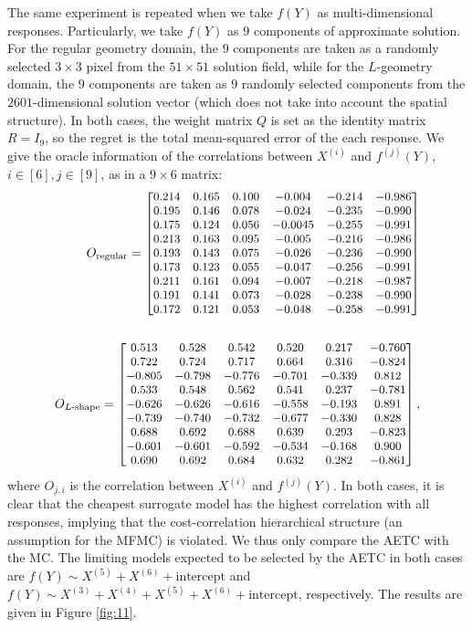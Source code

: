 \documentclass[a4paper,11pt]{article}
\numberwithin{equation}{section}
\theoremstyle{plain}
\theoremstyle{definition}
\begin{document}
The same experiment is repeated when we take $f(Y)$ as multi-dimensional responses. 
Particularly, we take $f(Y)$ as $9$ components of approximate solution.  
For the regular geometry domain, the $9$ components are taken as a randomly selected $3\times 3$ pixel from the $51\times 51$ solution field, while for the $L$-geometry domain, the $9$ components are taken as $9$ randomly selected components from the $2601$-dimensional solution vector (which does not take into account the spatial structure). 
In both cases, the weight matrix $Q$ is set as the identity matrix $R = I_9$, so the regret is the total mean-squared error of the each response. 
We give the oracle information of the correlations between $X^{(i)}$ and $f^{(j)}(Y)$, $i\in [6], j\in [9]$, as in a $9\times 6$ matrix:
\begin{align*}
\small
O_{\text{regular}} = 
\begin{bmatrix}
0.214 &0.165 &0.100 &-0.004 &-0.214&-0.986  \\
0.195&0.146 & 0.078& -0.024&-0.235&-0.990  \\
0.175& 0.124& 0.056& -0.0045&-0.255&-0.991 \\
0.213& 0.163& 0.095& -0.005&-0.216&-0.986  \\
0.193& 0.143& 0.075& -0.026&-0.236&-0.990  \\
0.173& 0.123& 0.055& -0.047&-0.256&-0.991 \\
0.211& 0.161& 0.094& -0.007&-0.218&-0.987 \\
0.191& 0.141& 0.073& -0.028&-0.238&-0.990  \\
0.172& 0.121& 0.053& -0.048&-0.258&-0.991
\end{bmatrix}\\
\\
\small O_{\text{$L$-shape}} = 
\begin{bmatrix}
0.513 &0.528 &0.542&0.520 &0.217 &-0.760 \\
0.722&0.724 & 0.717&0.664& 0.316&-0.824 \\
-0.805& -0.798&-0.776& -0.701& -0.339&0.812 \\
0.533& 0.548& 0.562&0.541& 0.237&-0.781  \\
-0.626& -0.626& -0.616&-0.558& -0.193&0.891  \\
-0.739& -0.740&-0.732& -0.677& -0.330&0.828 \\
0.688& 0.692&0.688& 0.639& 0.293&-0.823 \\
-0.601 &-0.601&-0.592& -0.534& -0.168&0.900  \\
0.690&0.692&0.684& 0.632& 0.282&-0.861
\end{bmatrix},
\end{align*}
where $O_{j,i}$ is the correlation between $X^{(i)}$ and $f^{(j)}(Y)$.  
In both cases, it is clear that the cheapest surrogate model has the highest correlation with all responses, implying that the cost-correlation hierarchical structure (an assumption for the MFMC) is violated. We thus only compare the AETC with the MC. The limiting models expected to be selected by the AETC in both cases are $f(Y)\sim X^{(5)}+X^{(6)}+\text{intercept}$ and $f(Y)\sim X^{(3)}+X^{(4)}+X^{(5)}+X^{(6)}+\text{intercept}$, respectively. The results are given in Figure \ref{fig:11}.
\end{document}
